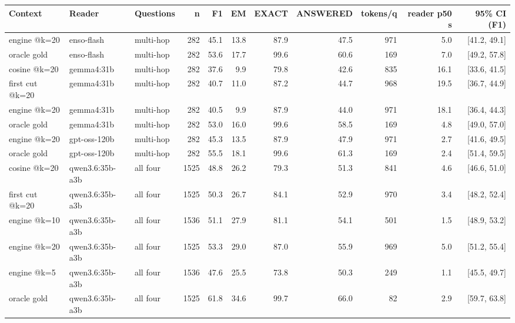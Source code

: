 \begin{tabular}{lllrrrrrrrr}
\toprule
Context & Reader & Questions & n & F1 & EM & EXACT & ANSWERED & tokens/q & reader p50 s & 95\% CI (F1) \\
\midrule
engine @k=20 & enso-flash & multi-hop & 282 & 45.1 & 13.8 & 87.9 & 47.5 & 971 & 5.0 & [41.2, 49.1] \\
oracle gold & enso-flash & multi-hop & 282 & 53.6 & 17.7 & 99.6 & 60.6 & 169 & 7.0 & [49.2, 57.8] \\
cosine @k=20 & gemma4:31b & multi-hop & 282 & 37.6 & 9.9 & 79.8 & 42.6 & 835 & 16.1 & [33.6, 41.5] \\
first cut @k=20 & gemma4:31b & multi-hop & 282 & 40.7 & 11.0 & 87.2 & 44.7 & 968 & 19.5 & [36.7, 44.9] \\
engine @k=20 & gemma4:31b & multi-hop & 282 & 40.5 & 9.9 & 87.9 & 44.0 & 971 & 18.1 & [36.4, 44.3] \\
oracle gold & gemma4:31b & multi-hop & 282 & 53.0 & 16.0 & 99.6 & 58.5 & 169 & 4.8 & [49.0, 57.0] \\
engine @k=20 & gpt-oss-120b & multi-hop & 282 & 45.3 & 13.5 & 87.9 & 47.9 & 971 & 2.7 & [41.6, 49.5] \\
oracle gold & gpt-oss-120b & multi-hop & 282 & 55.5 & 18.1 & 99.6 & 61.3 & 169 & 2.4 & [51.4, 59.5] \\
cosine @k=20 & qwen3.6:35b-a3b & all four & 1525 & 48.8 & 26.2 & 79.3 & 51.3 & 841 & 4.6 & [46.6, 51.0] \\
first cut @k=20 & qwen3.6:35b-a3b & all four & 1525 & 50.3 & 26.7 & 84.1 & 52.9 & 970 & 3.4 & [48.2, 52.4] \\
engine @k=10 & qwen3.6:35b-a3b & all four & 1536 & 51.1 & 27.9 & 81.1 & 54.1 & 501 & 1.5 & [48.9, 53.2] \\
engine @k=20 & qwen3.6:35b-a3b & all four & 1525 & 53.3 & 29.0 & 87.0 & 55.9 & 969 & 5.0 & [51.2, 55.4] \\
engine @k=5 & qwen3.6:35b-a3b & all four & 1536 & 47.6 & 25.5 & 73.8 & 50.3 & 249 & 1.1 & [45.5, 49.7] \\
oracle gold & qwen3.6:35b-a3b & all four & 1525 & 61.8 & 34.6 & 99.7 & 66.0 & 82 & 2.9 & [59.7, 63.8] \\
\bottomrule
\end{tabular}
